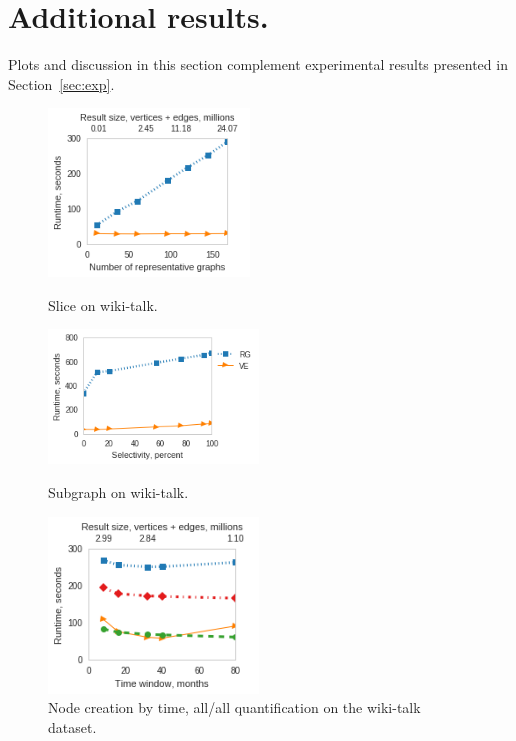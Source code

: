 \section{Additional results.}
\label{sec:app2}

Plots and discussion in this section complement experimental results
presented in Section~\ref{sec:exp}.

\begin{figure}[th]
\centering
\begin{minipage}{2.1in}
\centering
\includegraphics[width=2.1in]{figs/slice_wikitalk_build13.png}
\vspace{-0.2in}
\caption{Slice on wiki-talk.}
\label{fig:slicewiki}
\vspace{-0.1in}
\end{minipage}
\begin{minipage}{2.2in}
\centering
\includegraphics[width=2.2in]{figs/subgraph_wikitalk_build13.png}
\caption{Subgraph on wiki-talk.}
\vspace{-0.1in}
\label{fig:subgraphwiki}
\vspace{-0.1in}
\end{minipage}
\begin{minipage}{2.2in}
\centering
\includegraphics[width=2.2in]{figs/agg_allall_wikitalk_build13.png}
\caption{Node creation by time, all/all quantification on the wiki-talk dataset.}
\label{fig:agg1}
\end{minipage}
\end{figure}



